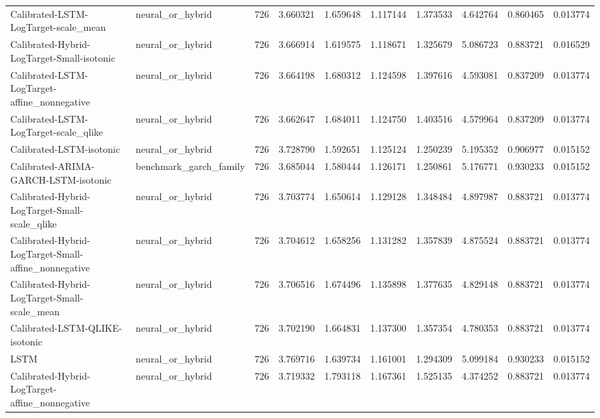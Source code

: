 \begin{tabular}{l l r r r r r r r r}
Calibrated-LSTM-LogTarget-scale\_mean & neural\_or\_hybrid & 726 & 3.660321 & 1.659648 & 1.117144 & 1.373533 & 4.642764 & 0.860465 & 0.013774 \\
Calibrated-Hybrid-LogTarget-Small-isotonic & neural\_or\_hybrid & 726 & 3.666914 & 1.619575 & 1.118671 & 1.325679 & 5.086723 & 0.883721 & 0.016529 \\
Calibrated-LSTM-LogTarget-affine\_nonnegative & neural\_or\_hybrid & 726 & 3.664198 & 1.680312 & 1.124598 & 1.397616 & 4.593081 & 0.837209 & 0.013774 \\
Calibrated-LSTM-LogTarget-scale\_qlike & neural\_or\_hybrid & 726 & 3.662647 & 1.684011 & 1.124750 & 1.403516 & 4.579964 & 0.837209 & 0.013774 \\
Calibrated-LSTM-isotonic & neural\_or\_hybrid & 726 & 3.728790 & 1.592651 & 1.125124 & 1.250239 & 5.195352 & 0.906977 & 0.015152 \\
Calibrated-ARIMA-GARCH-LSTM-isotonic & benchmark\_garch\_family & 726 & 3.685044 & 1.580444 & 1.126171 & 1.250861 & 5.176771 & 0.930233 & 0.015152 \\
Calibrated-Hybrid-LogTarget-Small-scale\_qlike & neural\_or\_hybrid & 726 & 3.703774 & 1.650614 & 1.129128 & 1.348484 & 4.897987 & 0.883721 & 0.013774 \\
Calibrated-Hybrid-LogTarget-Small-affine\_nonnegative & neural\_or\_hybrid & 726 & 3.704612 & 1.658256 & 1.131282 & 1.357839 & 4.875524 & 0.883721 & 0.013774 \\
Calibrated-Hybrid-LogTarget-Small-scale\_mean & neural\_or\_hybrid & 726 & 3.706516 & 1.674496 & 1.135898 & 1.377635 & 4.829148 & 0.883721 & 0.013774 \\
Calibrated-LSTM-QLIKE-isotonic & neural\_or\_hybrid & 726 & 3.702190 & 1.664831 & 1.137300 & 1.357354 & 4.780353 & 0.883721 & 0.013774 \\
LSTM & neural\_or\_hybrid & 726 & 3.769716 & 1.639734 & 1.161001 & 1.294309 & 5.099184 & 0.930233 & 0.015152 \\
Calibrated-Hybrid-LogTarget-affine\_nonnegative & neural\_or\_hybrid & 726 & 3.719332 & 1.793118 & 1.167361 & 1.525135 & 4.374252 & 0.883721 & 0.013774 \\
\hline
\end{tabular}
